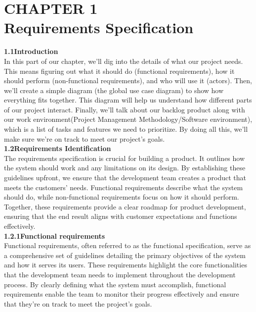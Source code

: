 \documentclass{article}
\begin{document}
\section*{\Huge CHAPTER 1\vspace{0.5cm}\\Requirements Specification}
\vspace{1.5cm}

{\Large \textbf{1.1\hspace{1em}Introduction}}\vspace{0.2cm}
\\In this part of our chapter, we'll dig into the details of what our project needs. This means figuring out what it should do (functional requirements), how it should perform (non-functional requirements), and who will use it (actors). Then, we'll create a simple diagram (the global use case diagram) to show how everything fits together. This diagram will help us understand how different parts of our project interact. Finally, we'll talk about our backlog product along with our work environment(Project Management Methodology/Software environment), which is a list of tasks and features we need to prioritize. By doing all this, we'll make sure we're on track to meet our project's goals.\vspace{0.5cm}
\\{\Large \textbf{1.2\hspace{1em}Requirements Identification}}\vspace{0.2cm}
\\The requirements specification is crucial for building a product. It outlines how the system should work and any limitations on its design. By establishing these guidelines upfront, we ensure that the development team creates a product that meets the customers' needs. Functional requirements describe what the system should do, while non-functional requirements focus on how it should perform. Together, these requirements provide a clear roadmap for product development, ensuring that the end result aligns with customer expectations and functions effectively.\vspace{0.5cm}
\\{\large \textbf{1.2.1\hspace{1em}Functional requirements}}\vspace{0.2cm}
\\Functional requirements, often referred to as the functional specification, serve as a comprehensive set of guidelines detailing the primary objectives of the system and how it serves its users. These requirements highlight the core functionalities that the development team needs to implement throughout the development process. By clearly defining what the system must accomplish, functional requirements enable the team to monitor their progress effectively and ensure that they're on track to meet the project's goals.\vspace{0.1cm}
\end{document}
